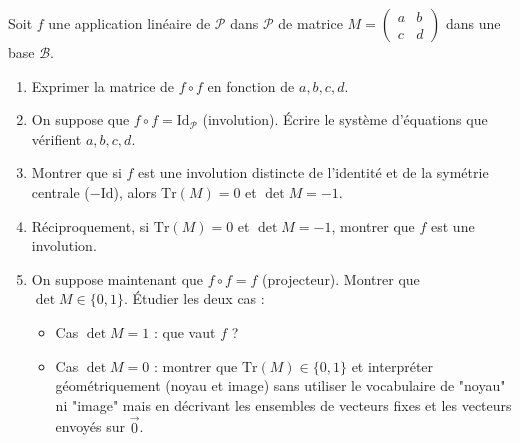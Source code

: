 \documentclass[11pt]{article}
\begin{document}
\begin{exercice}
Soit $f$ une application linéaire de $\mathcal{P}$ dans $\mathcal{P}$ de matrice $M = \begin{pmatrix} a & b \\ c & d \end{pmatrix}$ dans une base $\mathcal{B}$.
\begin{enumerate}
    \item Exprimer la matrice de $f \circ f$ en fonction de $a,b,c,d$.
    \item On suppose que $f \circ f = \text{Id}_{\mathcal{P}}$ (involution). Écrire le système d'équations que vérifient $a,b,c,d$.
    \item Montrer que si $f$ est une involution distincte de l'identité et de la symétrie centrale ($-\text{Id}$), alors $\text{Tr}(M) = 0$ et $\det M = -1$.
    \item Réciproquement, si $\text{Tr}(M)=0$ et $\det M = -1$, montrer que $f$ est une involution.
    \item On suppose maintenant que $f \circ f = f$ (projecteur). Montrer que $\det M \in \{0,1\}$. Étudier les deux cas :
    \begin{itemize}
        \item Cas $\det M = 1$ : que vaut $f$ ?
        \item Cas $\det M = 0$ : montrer que $\text{Tr}(M) \in \{0,1\}$ et interpréter géométriquement (noyau et image) sans utiliser le vocabulaire de "noyau" ni "image" mais en décrivant les ensembles de vecteurs fixes et les vecteurs envoyés sur $\vec{0}$.
    \end{itemize}
\end{enumerate}
\end{exercice}
\end{document}
